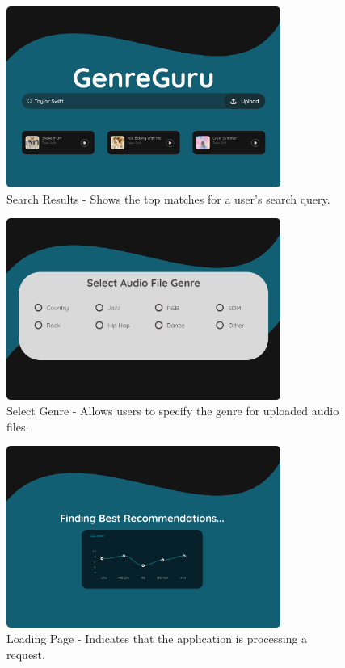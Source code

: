 \documentclass[12pt, titlepage]{article}
\begin{document}
\begin{figure}[h!]
    \centering
    \includegraphics[width=0.8\textwidth]{UI_Images/Search_Results.png}
    \caption{Search Results - Shows the top matches for a user’s search query.}
    \label{fig:search_results}
\end{figure}

\begin{figure}[h!]
    \centering
    \includegraphics[width=0.8\textwidth]{UI_Images/Select_Genre.png}
    \caption{Select Genre - Allows users to specify the genre for uploaded audio files.}
    \label{fig:select_genre}
\end{figure}

\begin{figure}[h!]
  \centering
  \includegraphics[width=0.8\textwidth]{UI_Images/Loading_Page.png}
  \caption{Loading Page - Indicates that the application is processing a request.}
  \label{fig:loading_page}
\end{figure}
\end{document}
